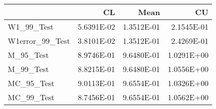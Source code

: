 \begin{tabular}{lrrr}
\toprule
{} &         CL &       Mean &         CU \\
\midrule
W1\_99\_Test      & 5.6391E-02 & 1.3512E-01 & 2.1545E-01 \\
W1error\_99\_Test & 3.8101E-02 & 1.3512E-01 & 2.4269E-01 \\
M\_95\_Test       & 8.9746E-01 & 9.6480E-01 & 1.0291E+00 \\
M\_99\_Test       & 8.8215E-01 & 9.6480E-01 & 1.0556E+00 \\
MC\_95\_Test      & 9.0113E-01 & 9.6554E-01 & 1.0326E+00 \\
MC\_99\_Test      & 8.7456E-01 & 9.6554E-01 & 1.0562E+00 \\
\bottomrule
\end{tabular}
